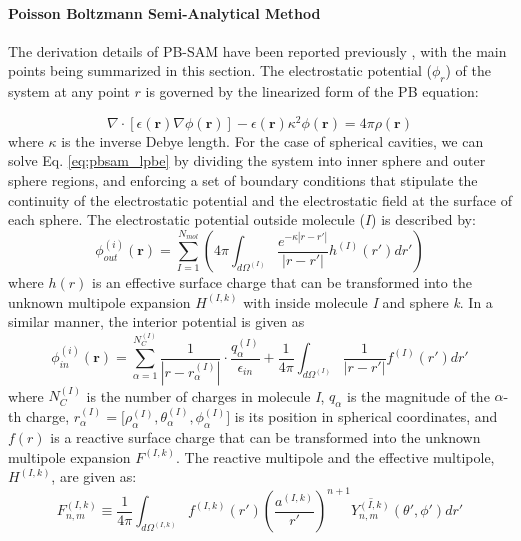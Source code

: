 \documentclass[11pt,titlepage]{article}
\begin{document}
\paragraph{Poisson Boltzmann Semi-Analytical Method}
The derivation details of PB-SAM have been reported  previously \cite{yap2010,yap2013}, with the main points being summarized in this section. The electrostatic potential ($\phi_r$) of the system at any point $r$ is governed by the linearized form of the PB equation:

\begin{equation}
\nabla \cdot [ \epsilon(\mathbf{r}) \nabla \phi (\mathbf{r}) ] - \epsilon (\mathbf{r}) \kappa^2 \phi(\mathbf{r}) = 4 \pi \rho(\mathbf{r})
\label{eq:pbsam_lpbe}
\end{equation}
%
where $\kappa$ is the inverse Debye length. For the case of spherical cavities, we can solve Eq. \ref{eq:pbsam_lpbe} by dividing the system into inner sphere and outer sphere regions, and enforcing a set of boundary conditions that stipulate the continuity of the electrostatic potential and the electrostatic field at the surface of each sphere. The electrostatic potential outside molecule ($I$) is described by:
%
\begin{equation}
\phi_{out}^{(i)} (\mathbf{r})  = \sum_{I=1}^{N_{mol}} \left( 4 \pi \int_{d\Omega^{(I)}} \frac{e^{-\kappa | r - r'|}}{|r - r'|} h^{(I)} (r') dr'  \right)
\label{eq:pbsam_phi_in}
\end{equation}
%
where \(h(r)\) is an effective surface charge that can be transformed into the unknown multipole expansion \(H^{(I,k)}\) with inside molecule \textit{I} and sphere \textit{k}. In a similar manner, the interior potential is given as
%
\begin{equation}
\phi_{in}^{(i)} (\mathbf{r})  = \sum_{\alpha = 1}^{N_C^{(I)}} \frac{1}{|r-r_{\alpha}^{(I)}|} \cdot \frac{q_\alpha^{(I)}} {\epsilon_{in}} + \frac{1}{4\pi} \int_{d\Omega^{(I)}} \frac{1}{|r - r'|} f^{(I)} (r') dr' 
\label{eq:pbsam_phi_out}
\end{equation}
%
where \( N_C^{(I)}\) is the number of charges in molecule \textit{I}, \( q_\alpha\) 
is the magnitude of the \(\alpha\)-th charge, \( r_\alpha^{(I)} = \Big[\rho_{\alpha}^{(I)} , \theta_{\alpha}^{(I)} , \phi_{\alpha}^{(I)} \Big]\) is its position in spherical 
coordinates, and \(f(r)\) is a reactive surface charge that can
be transformed into the unknown multipole expansion \(F^{(I,k)}\). The reactive multipole and the effective multipole, \(H^{(I,k)}\), are given as:
%
\begin{equation}
F_{n,m}^{(I,k)} \equiv  \frac{1}{4\pi} \int_{d\Omega^{(I,k)}} f^{(I,k)}(r') \left (  \frac{ a^{(I,k)}}  {r'} \right ) ^{n+1} \overline{ Y^{(I,k)}_{n,m}} (\theta' , \phi') dr'
\label{eq:fmat}
\end{equation}
\end{document}
